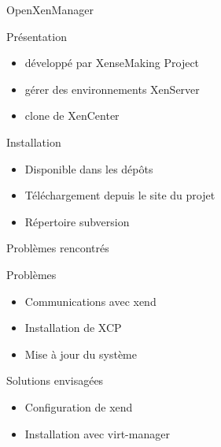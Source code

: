 \begin{frame}
  \begin{center}
   \huge{OpenXenManager}
  \end{center}
\end{frame}

\begin{frame}{Présentation}
  \begin{itemize}
    \item développé par XenseMaking Project 
      \pause
    \item gérer des environnements XenServer
      \pause
    \item clone de XenCenter
  \end{itemize}
\end{frame}

\begin{frame}{Installation}
  \begin{itemize}
    \item Disponible dans les dépôts
      \pause
    \item Téléchargement depuis le site du projet
      \pause
    \item Répertoire subversion
  \end{itemize}
\end{frame}

\begin{frame}{Problèmes rencontrés}
 \begin{alertblock}{Problèmes}
   \begin{itemize}
     \item Communications avec xend
       \pause
     \item Installation de XCP
       \pause
     \item Mise à jour du système
   \end{itemize}
 \end{alertblock}
\pause
 \begin{exampleblock}{Solutions envisagées}
   \begin{itemize}
     \item Configuration de xend
       \pause
     \item Installation avec virt-manager
   \end{itemize}
 \end{exampleblock}
\end{frame}

